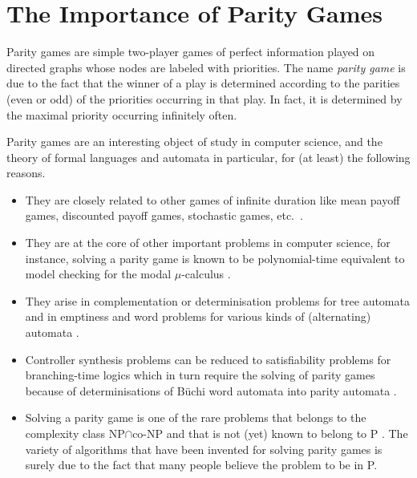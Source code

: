 \section{The Importance of Parity Games}

Parity games are simple two-player games of perfect information played on directed graphs whose
nodes are labeled with priorities. The name \emph{parity game} is due to the fact that the winner
of a play is determined according to the parities (even or odd) of the priorities occurring in
that play. In fact, it is determined by the maximal priority occurring infinitely often. %

Parity games are an interesting object of study in computer science, and the theory of formal languages
and automata in particular, for (at least) the following reasons.
\begin{itemize}
\item They are closely related to other games of infinite duration like mean payoff games,
      discounted payoff games, stochastic games, etc.\ \cite{Jurdzinski/98,purithesis,Stirling95}.
\item They are at the core of other important problems in computer science, for instance, solving a
      parity game is known to be polynomial-time equivalent to model checking for the modal
      $\mu$-calculus \cite{Emerson93a,Stirling95}. 
\item They arise in complementation or determinisation problems for tree automata
      \cite{lncs2500,focs91*368} and in emptiness and word problems for various kinds of (alternating) 
      automata \cite{focs91*368}.
\item Controller synthesis problems can be reduced to satisfiability problems for branching-time logics
      \cite{AVW03} which in turn require the solving of parity games because
      of determinisations of B\"uchi word automata into parity automata 
      \cite{conf/lics/Piterman06,conf/icalp/KahlerW08}.
\item Solving a parity game is one of the rare problems that belongs to the complexity class
      NP$\cap$co-NP and that is not (yet) known to belong to P \cite{Emerson93a}. The variety of algorithms
      that have been invented for solving parity games is surely due to the fact that many people believe
      the problem to be in P.
\end{itemize}

